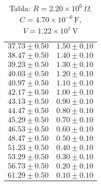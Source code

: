 \begin{table}[H]
\begin{tabular}{|c|c|}
$37.73 \pm 0.50$ & $1.50 \pm 0.10$ \\
$38.47 \pm 0.50$ & $1.40 \pm 0.10$ \\
$39.23 \pm 0.50$ & $1.30 \pm 0.10$ \\
$40.03 \pm 0.50$ & $1.20 \pm 0.10$ \\
$40.97 \pm 0.50$ & $1.10 \pm 0.10$ \\
$42.17 \pm 0.50$ & $1.00 \pm 0.10$ \\
$43.13 \pm 0.50$ & $0.90 \pm 0.10$ \\
$44.47 \pm 0.50$ & $0.80 \pm 0.10$ \\
$45.29 \pm 0.50$ & $0.70 \pm 0.10$ \\
$46.53 \pm 0.50$ & $0.60 \pm 0.10$ \\
$48.47 \pm 0.50$ & $0.50 \pm 0.10$ \\
$51.23 \pm 0.50$ & $0.40 \pm 0.10$ \\
$53.29 \pm 0.50$ & $0.30 \pm 0.10$ \\
$56.73 \pm 0.50$ & $0.20 \pm 0.10$ \\
$61.29 \pm 0.50$ & $0.10 \pm 0.10$ \\
\hline
\end{tabular}
\caption*{Tabla: $R = 2.20 \times 10^{6}\,\Omega$, $C = 4.70 \times 10^{-6}$\,F, $V = 1.22 \times 10^{1}$\,V}
\end{table}
